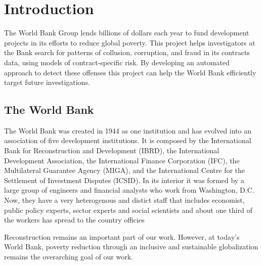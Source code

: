 \chapter{Introduction}\label{chap_intro}

The World Bank Group lends billions of dollars each year to fund development projects in its efforts to reduce global poverty. This project helps investigators at the Bank search for patterns of collusion, corruption, and fraud in its contracts data, using models of contract-specific risk. By developing an automated approach to detect these offenses this project can help the World Bank efficiently target future investigations.


\section{The World Bank}

The World Bank was created in 1944 as one institution and has evolved into an association of five development institutions. It is composed by  the International Bank for Reconstruction and Development (IBRD), the International Development Association, the International Finance Corporation (IFC), the Multilateral Guarantee Agency (MIGA), and the International Centre for the Settlement of Investment Disputes (ICSID). In its interior it was formed by a large group of engineers and financial analysts who work from Washington, D.C. Now, they have a very heterogenous and distict staff that includes economist, public policy experts, sector experts and social scientists and  about one third of the workers has spread to the country officies 

\parencite{wbhistory} 
\cite{Bivand}

Reconstruction remains an important part of our work. However, at today's World Bank, poverty reduction through an inclusive and sustainable globalization remains the overarching goal of our work.


